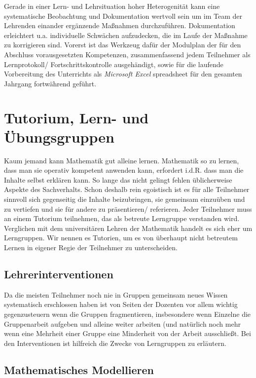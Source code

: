 \documentclass[a4paper]{book}%
\theoremstyle{definition}
\begin{document}
Gerade in einer Lern- und Lehrsituation hoher Heterogenität kann eine systematische Beobachtung und Dokumentation wertvoll sein um im Team der Lehrenden einander ergänzende Maßnahmen durchzuführen. Dokumentation erleichtert u.a. individuelle Schwächen aufzudecken, die im Laufe der Maßnahme zu korrigieren sind. Vorerst ist das Werkzeug dafür der Modulplan der für den Abschluss vorausgesetzten Kompetenzen, zusammenfassend jedem Teilnehmer als Lernprotokoll/ Fortschrittskontrolle ausgehändigt, sowie für die laufende Vorbereitung des Unterrichts als \textit{Microsoft Excel} spreadsheet für den gesamten Jahrgang fortwährend geführt.


\chapter{Tutorium, Lern- und Übungsgruppen}

Kaum jemand kann Mathematik gut alleine lernen. Mathematik so zu lernen, dass man sie operativ kompetent anwenden kann, erfordert i.d.R. dass man die Inhalte selbst erklären kann. So lange das nicht gelingt fehlen üblicherweise Aspekte des Sachverhalts. Schon deshalb rein egoistisch ist es für alle Teilnehmer sinnvoll sich gegenseitig die Inhalte beizubringen, sie gemeinsam einzuüben und zu vertiefen und sie für andere zu präsentieren/ referieren. Jeder Teilnehmer muss an einem Tutorium teilnehmen, das als betreute Lerngruppe verstanden wird. Verglichen mit dem universitären Lehren der Mathematik handelt es sich eher um Lerngruppen. Wir nennen es Tutorien, um es von überhaupt nicht betreutem Lernen in eigener Regie der Teilnehmer zu unterscheiden.


\section{Lehrerinterventionen}

Da die meisten Teilnehmer noch nie in Gruppen gemeinsam neues Wissen systematisch erschlossen haben ist von Seiten der Dozenten vor allem wichtig gegenzusteuern wenn die Gruppen fragmentieren, insbesondere wenn Einzelne die Gruppenarbeit aufgeben und alleine weiter arbeiten (und natürlich noch mehr wenn eine Mehrheit einer Gruppe eine Minderheit von der Arbeit ausschließt. Bei den Interventionen ist hilfreich die Zwecke von Lerngruppen zu erläutern.


\section{Mathematisches Modellieren}
\end{document}
